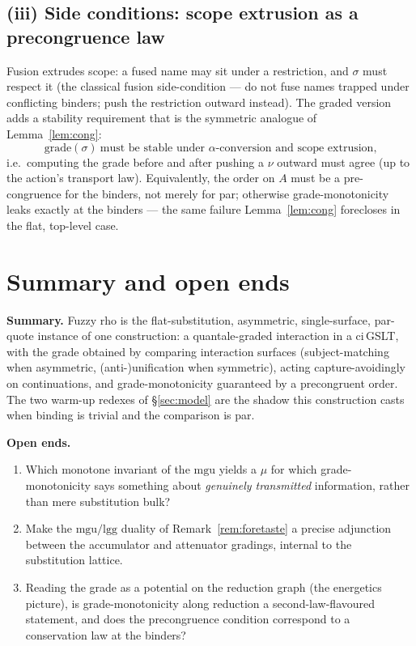 \documentclass[11pt]{article}
\theoremstyle{plain}
\theoremstyle{definition}
\theoremstyle{remark}
\newcommand{\meas}{\mu}
\newcommand{\mgu}{\mathrm{mgu}}
\newcommand{\lgg}{\mathrm{lgg}}
\begin{document}
\subsection{(iii) Side conditions: scope extrusion as a precongruence law}

Fusion extrudes scope: a fused name may sit under a restriction, and $\sigma$ must respect it (the
classical fusion side-condition --- do not fuse names trapped under conflicting binders; push the
restriction outward instead). The graded version adds a stability requirement that is the symmetric
analogue of Lemma~\ref{lem:cong}:
\[
\mathrm{grade}(\sigma)\ \text{must be stable under $\alpha$-conversion and scope extrusion,}
\]
i.e.\ computing the grade before and after pushing a $\nu$ outward must agree (up to the action's
transport law). Equivalently, the order on $A$ must be a pre-congruence for the binders, not merely
for par; otherwise grade-monotonicity leaks exactly at the binders --- the same failure
Lemma~\ref{lem:cong} forecloses in the flat, top-level case.

\section{Summary and open ends}

\noindent\textbf{Summary.} Fuzzy rho is the flat-substitution, asymmetric, single-surface, par-quote
instance of one construction: a quantale-graded interaction in a ci\,GSLT, with the grade obtained by
comparing interaction surfaces (subject-matching when asymmetric, (anti-)unification when symmetric),
acting capture-avoidingly on continuations, and grade-monotonicity guaranteed by a precongruent
order. The two warm-up redexes of \S\ref{sec:model} are the shadow this construction casts when
binding is trivial and the comparison is par.

\medskip\noindent\textbf{Open ends.}
\begin{enumerate}
\item Which monotone invariant of the $\mgu$ yields a $\meas$ for which grade-monotonicity says
something about \emph{genuinely transmitted} information, rather than mere substitution bulk?
\item Make the $\mgu/\lgg$ duality of Remark~\ref{rem:foretaste} a precise adjunction between the
accumulator and attenuator gradings, internal to the substitution lattice.
\item Reading the grade as a potential on the reduction graph (the energetics picture), is
grade-monotonicity along reduction a second-law-flavoured statement, and does the precongruence
condition correspond to a conservation law at the binders?
\end{enumerate}
\end{document}
